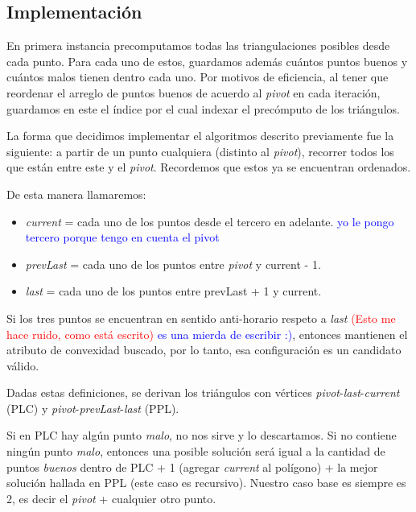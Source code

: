 \subsection{Implementación}
En primera instancia precomputamos todas las triangulaciones posibles desde cada punto. Para cada uno de estos, guardamos además cuántos puntos buenos y cuántos malos tienen dentro cada uno. Por motivos de eficiencia, al tener que reordenar el arreglo de puntos buenos de acuerdo al \textit{pivot} en cada iteración, guardamos en este el índice por el cual indexar el precómputo de los triángulos.

La forma que decidimos implementar el algoritmos descrito previamente fue la siguiente: a partir de un punto cualquiera (distinto al \textit{pivot}), recorrer todos los que están entre este y el \textit{pivot}. Recordemos que estos ya se encuentran ordenados.

De esta manera llamaremos:
\begin{itemize}
  \item \textit{current} = cada uno de los puntos desde el tercero en adelante. \textcolor{blue}{yo le pongo tercero porque tengo en cuenta el pivot}

  \item \textit{prevLast} = cada uno de los puntos entre \textit{pivot} y current - 1.

  \item \textit{last} = cada uno de los puntos entre prevLast + 1 y current.
\end{itemize}

Si los tres puntos se encuentran en sentido anti-horario respeto a \textit{last} \textcolor{red}{(Esto me hace ruido, como está escrito)} \textcolor{blue}{es una mierda de escribir :)}, entonces mantienen el atributo de convexidad buscado, por lo tanto, esa configuración es un candidato válido.

Dadas estas definiciones, se derivan los triángulos con vértices \textit{pivot}-\textit{last}-\textit{current} (PLC) y \textit{pivot}-\textit{prevLast}-\textit{last} (PPL).

Si en PLC hay algún punto \textit{malo}, no nos sirve y lo descartamos. Si no contiene ningún punto \textit{malo}, entonces una posible solución será igual a la cantidad de puntos \textit{buenos} dentro de PLC + 1 (agregar \textit{current} al polígono) + la mejor solución hallada en PPL (este caso es recursivo). Nuestro caso base es siempre es 2, es decir el \textit{pivot} + cualquier otro punto.

